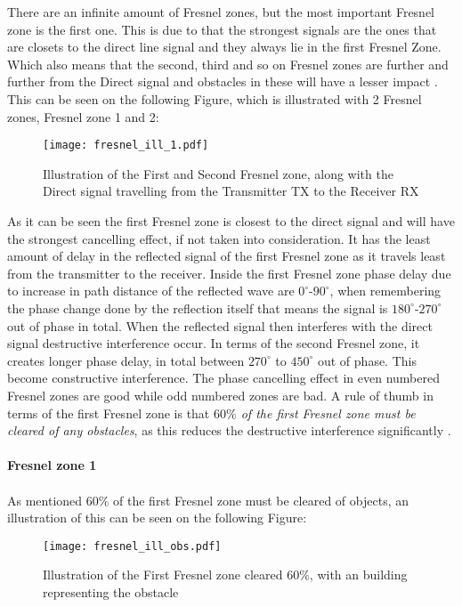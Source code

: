 There are an infinite amount of Fresnel zones, but the most important Fresnel zone is the first one. This is due to that the strongest signals are the ones that are closets to the direct line signal %
and they always lie in the first Fresnel Zone.  
Which also means that the second, third and so on Fresnel zones are further and further from the Direct signal and obstacles in these will have a lesser impact \citep{introRF}. This can be seen on the following Figure, which is illustrated with 2 Fresnel zones, Fresnel zone 1 and 2:
\begin{figure}[H]
\centering
\texttt{[image: fresnel\_ill\_1.pdf]}
\caption{Illustration of the First and Second Fresnel zone, along with the Direct signal travelling from the Transmitter TX to the Receiver RX}
\label{dijdk}
\end{figure}

As it can be seen the first Fresnel zone is closest to the direct signal and will have the strongest cancelling effect, if not taken into consideration. It has the least amount of delay in the reflected signal of the first Fresnel zone as it travels least from the transmitter to the receiver. Inside the first Fresnel zone phase delay due to increase in path distance of the reflected wave are $0^\circ$-$90^\circ$, when remembering the phase change done by the reflection itself that means the signal is $180^\circ$-$270^\circ$ out of phase in total. When the reflected signal then interferes with the direct signal destructive interference occur. In terms of the second Fresnel zone, it creates longer phase delay, in total between $270^\circ$ to $450^\circ$ out of phase. This become constructive interference. The phase cancelling effect in even numbered Fresnel zones are good while odd numbered zones are bad. A rule of thumb in terms of the first Fresnel zone is that \textit{$60\%$ of the first Fresnel zone must be cleared of any obstacles}, as this reduces the destructive interference significantly \citep{introRF}\citep{Fres2}. 
\\
\\


\textbf{Fresnel zone 1}
\\
\\
As mentioned $60\%$ of the first Fresnel zone must be cleared of objects, an illustration of this can be seen on the following Figure:
\begin{figure}[H]
\centering
\texttt{[image: fresnel\_ill\_obs.pdf]}
\caption{Illustration of the First Fresnel zone cleared $60\%$, with an building representing the obstacle}
\label{dijdk1}
\end{figure}



